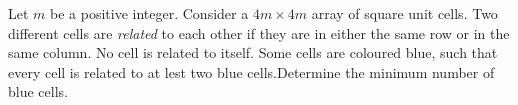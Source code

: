 Let $m$ be a positive integer. Consider a $4m\times 4m$ array of square unit cells. Two different cells are \emph{related} to each other if they are in either the same row or in the same column. No cell is related to itself. Some cells are coloured blue, such that every cell is related to at lest two blue cells.Determine the minimum number of blue cells.